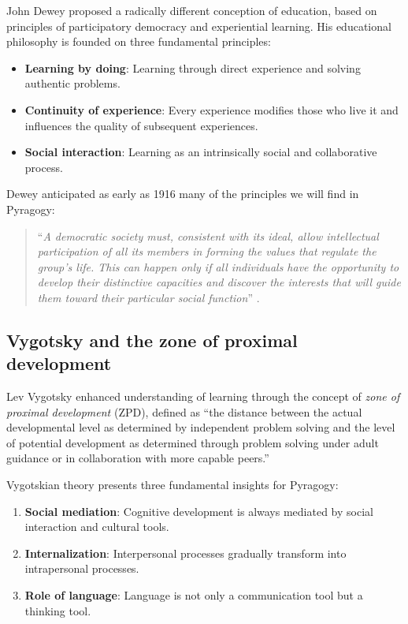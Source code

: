 John Dewey \cite{Dewey1916} proposed a radically different conception of education, based on principles of participatory democracy and experiential learning. His educational philosophy is founded on three fundamental principles:

\begin{itemize}
	\item \textbf{Learning by doing}: Learning through direct experience and solving authentic problems.
	\item \textbf{Continuity of experience}: Every experience modifies those who live it and influences the quality of subsequent experiences.  
	\item \textbf{Social interaction}: Learning as an intrinsically social and collaborative process.
\end{itemize}

Dewey anticipated as early as 1916 many of the principles we will find in Pyragogy:

\begin{quote}
	``\textit{A democratic society must, consistent with its ideal, allow intellectual participation of all its members in forming the values that regulate the group's life. This can happen only if all individuals have the opportunity to develop their distinctive capacities and discover the interests that will guide them toward their particular social function}'' \cite{Dewey1916}.
\end{quote}

\subsection{Vygotsky and the zone of proximal development}

Lev Vygotsky \cite{Vygotsky1978} enhanced understanding of learning through the concept of \textit{zone of proximal development} (ZPD), defined as ``the distance between the actual developmental level as determined by independent problem solving and the level of potential development as determined through problem solving under adult guidance or in collaboration with more capable peers.''

Vygotskian theory presents three fundamental insights for Pyragogy:

\begin{enumerate}
	\item \textbf{Social mediation}: Cognitive development is always mediated by social interaction and cultural tools.
	\item \textbf{Internalization}: Interpersonal processes gradually transform into intrapersonal processes.
	\item \textbf{Role of language}: Language is not only a communication tool but a thinking tool.
\end{enumerate}

